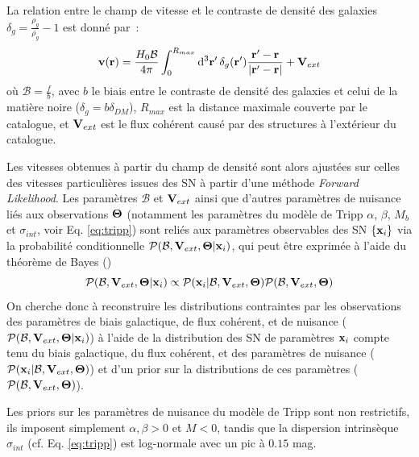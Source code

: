 \documentclass{book}
\let\mcl\mathcal
\let\ov\overline
\begin{document}
La relation entre le champ de vitesse et le contraste de densité des galaxies $\delta_g = \frac{\rho_g}{\ov{\rho_g}} - 1$ est donné par~:
\begin{equation}
    \vb v (\vb r) = \frac{H_0 \mcl B}{4 \pi} \int_0^{R_{max}} \dd[3]{\vb r'} \delta_g(\vb r') \frac{\vb r' - \vb r}{\abs{\vb r' - \vb r}} + \vb V_{ext}
\end{equation}
où $\mcl B =\frac{f}{b}$, avec $b$ le biais entre le contraste de densité des galaxies et celui de la matière noire ($\delta_g = b \delta_{DM}$), $R_{max}$ est la distance maximale couverte par le catalogue, et $\vb V_{ext}$ est le flux cohérent causé par des structures à l'extérieur du catalogue.

Les vitesses obtenues à partir du champ de densité sont alors ajustées sur celles des vitesses particulières issues des SN à partir d'une méthode \textit{Forward Likelihood}. Les paramètres $\mcl B$ et $\vb V_{ext}$ ainsi que d'autres paramètres de nuisance liés aux observations $\vb \Theta$ (notamment les paramètres du modèle de Tripp $\alpha$, $\beta$, $M_b$ et $\sigma_{int}$, voir Eq. \ref{eq:tripp}) sont reliés aux paramètres observables des SN $\{\vb x_i\}$ via la probabilité conditionnelle $\mcl P(\mcl B, \vb V_{ext}, \vb \Theta | \vb x_i)$, qui peut être exprimée à l'aide du théorème de Bayes (\cite{stahl_peculiar-velocity_2021})
\begin{equation}
    \mcl P(\mcl B, \vb V_{ext}, \vb \Theta | \vb x_i) \propto \mcl P(\vb x_i|\mcl B, \vb V_{ext}, \vb \Theta) \mcl P(\mcl B, \vb V_{ext}, \vb \Theta)
\end{equation}
On cherche donc à reconstruire les distributions contraintes par les observations des paramètres de biais galactique, de flux cohérent, et de nuisance ($\mcl P(\mcl B, \vb V_{ext}, \vb \Theta | \vb x_i)$) à l'aide de la distribution des SN de paramètres  $\vb x_i$ compte tenu du biais galactique, du flux cohérent, et des paramètres de nuisance ($\mcl P(\vb x_i | \mcl B, \vb V_{ext}, \vb \Theta )$)  et d'un prior sur la distributions de ces paramètres ($\mcl P(\mcl B, \vb V_{ext}, \vb \Theta)$).

Les priors sur les paramètres de nuisance du modèle de Tripp sont non restrictifs, ils imposent simplement $\alpha, \beta > 0$ et $M < 0$, tandis que la dispersion intrinsèque $\sigma_{int}$ (cf. Eq. \ref{eq:tripp}) est log-normale avec un pic à $0.15$ mag.
\end{document}
